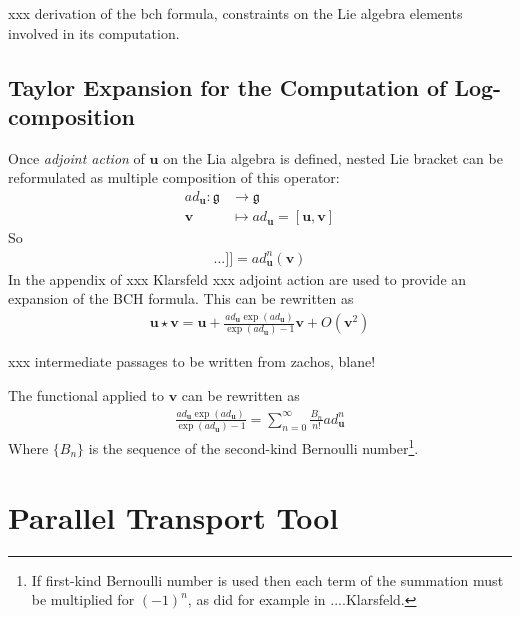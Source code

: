 \noindent
xxx derivation of the bch formula, constraints on the Lie algebra elements involved in its computation.

\subsection{Taylor Expansion for the Computation of Log-composition}



Once \emph{adjoint action} of $\mathbf{u}$ on the Lia algebra is defined, nested Lie bracket can be reformulated as multiple composition of this operator:
\begin{align*}
ad_{\mathbf{u}} : \mathfrak{g}  & \longrightarrow \mathfrak{g}  
\\
\mathbf{v} &\longmapsto ad_{\mathbf{u}}   =  [\mathbf{u}, \mathbf{v}]
\end{align*}
So
\begin{align*}
[  \underbrace{   \mathbf{u},[\mathbf{u},... [\mathbf{u}}_{\text{n-times}},\mathbf{v}]...]] =  ad_{\mathbf{u}}^{n}(\mathbf{v})
\end{align*}
In the appendix of xxx Klarsfeld xxx adjoint action are used to provide an expansion of the BCH formula. This can be rewritten as
\begin{align*}
\mathbf{u}\star \mathbf{v}  = \mathbf{u} + \frac{ ad_{\mathbf{u}} \exp(ad_{\mathbf{u}}) }{ \exp(ad_{\mathbf{u}}) - 1 }  \mathbf{v} + O({\mathbf{v}}^2)
\end{align*}

\noindent
xxx intermediate passages to be written from zachos, blane!

The functional applied to $\mathbf{v}$ can be rewritten as
\begin{align*}
\frac{ ad_{\mathbf{u}} \exp(ad_{\mathbf{u}}) }{ \exp(ad_{\mathbf{u}}) - 1 }  = \sum_{n=0}^{\infty} \frac{B_{n}}{n!} ad_{\mathbf{u}}^{n} 
\end{align*}
Where $\lbrace B_{n} \rbrace $ is the sequence of the second-kind Bernoulli number\footnote{If first-kind Bernoulli number is used then each term of the summation must be multiplied for $(-1)^{n}$, as did for example in ....Klarsfeld.}.



\section{Parallel Transport Tool}\label{ch:parallel_transport}

